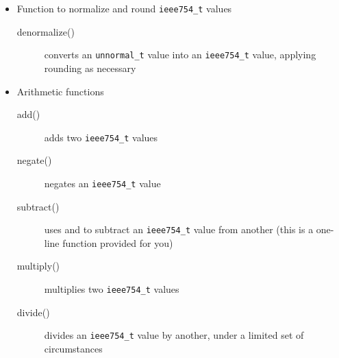 \begin{itemize}
\begin{description}
    \end{description}
    \item Function to normalize and round \lstinline{ieee754_t} values
    \begin{description}
        \item[denormalize()] converts an \lstinline{unnormal_t} value into an \lstinline{ieee754_t} value, applying rounding as necessary
    \end{description}
    \item Arithmetic functions
    \begin{description}
        \item[add()] adds two \lstinline{ieee754_t} values
        \item[negate()] negates an \lstinline{ieee754_t} value
        \item[subtract()] uses  and  to subtract an \lstinline{ieee754_t} value from another (this is a one-line function provided for you)
        \item[multiply()] multiplies two \lstinline{ieee754_t} values
        \item[divide()] divides an \lstinline{ieee754_t} value by another, under a limited set of circumstances
    \end{description}
\end{itemize}
